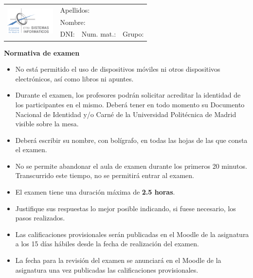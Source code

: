 \documentclass[12pt,a4paper,addpoints,answers]{exam}
\def\studentdata{
    \begin{table}[t]
        \renewcommand{\arraystretch}{1.2}
        \small
        \centering
        \begin{tabular}{|l|p{4cm}|p{4cm}|p{2.5cm}|}
            \hline
            \multirow{3}{*}{\includegraphics[width=2.5cm]{logos/etsisi.png}} & \multicolumn{3}{l|}{Apellidos:} \\ \cline{2-4} 
                                                                             & \multicolumn{3}{l|}{Nombre:}    \\ \cline{2-4} 
                                                                             & DNI:  & Num. mat.: & Grupo: \\ \hline
        \end{tabular}%
    \end{table}
}
\begin{document}
\studentdata

\begin{center}\textbf{Normativa de examen}\end{center}
\begin{itemize}
    \item No está permitido el uso de dispositivos móviles ni otros dispositivos electrónicos, así como libros ni apuntes.
    \item Durante el examen, los profesores podrán solicitar acreditar la identidad de los participantes en el mismo. Deberá tener en todo momento su Documento Nacional de Identidad y/o Carné de la Universidad Politécnica de Madrid visible sobre la mesa.
    \item Deberá escribir su nombre, con bolígrafo, en todas las hojas de las que consta el examen.
    \item No se permite abandonar el aula de examen durante los primeros 20 minutos. Transcurrido este tiempo, no se permitirá entrar al examen. 
    \item El examen tiene una duración máxima de \textbf{2.5 horas}. 
    \item Justifique sus respuestas lo mejor posible indicando, si fuese necesario, los pasos realizados.
    \item Las calificaciones provisionales serán publicadas en el Moodle de la asignatura a los 15 días hábiles desde la fecha de realización del examen.
    \item La fecha para la revisión del examen se anunciará en el Moodle de la asignatura una vez publicadas las calificaciones provisionales.
\end{itemize}
\newpage
\end{document}

